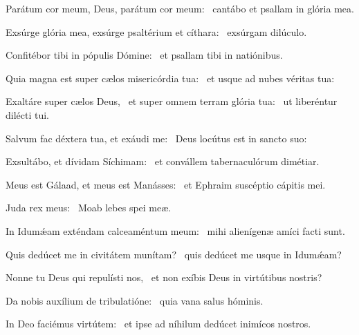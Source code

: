 \item Parátum cor meum, Deus, parátum cor meum:~\psstar{} cantábo et psallam in glória mea.

\item Exsúrge glória mea, exsúrge psaltérium et cíthara:~\psstar{} exsúrgam dilúculo.

\item Confitébor tibi in pópulis Dómine:~\psstar{} et psallam tibi in natiónibus.

\item Quia magna est super cælos misericórdia tua:~\psstar{} et usque ad nubes véritas tua:

\item Exaltáre super cælos Deus,~\pscross{} et super omnem terram glória tua:~\psstar{} ut liberéntur dilécti tui.

\item Salvum fac déxtera tua, et exáudi me:~\psstar{} Deus locútus est in sancto suo:

\item Exsultábo, et dívidam Síchimam:~\psstar{} et convállem tabernaculórum dimétiar.

\item Meus est Gálaad, et meus est Manásses:~\psstar{} et Ephraim suscéptio cápitis mei.

\item Juda rex meus:~\psstar{} Moab lebes spei meæ.

\item In Idumǽam exténdam calceaméntum meum:~\psstar{} mihi alienígenæ amíci facti sunt.

\item Quis dedúcet me in civitátem munítam?~\psstar{} quis dedúcet me usque in Idumǽam?

\item Nonne tu Deus qui repulísti nos,~\psstar{} et non exíbis Deus in virtútibus nostris?

\item Da nobis auxílium de tribulatióne:~\psstar{} quia vana salus hóminis.

\item In Deo faciémus virtútem:~\psstar{} et ipse ad níhilum dedúcet inimícos nostros.
